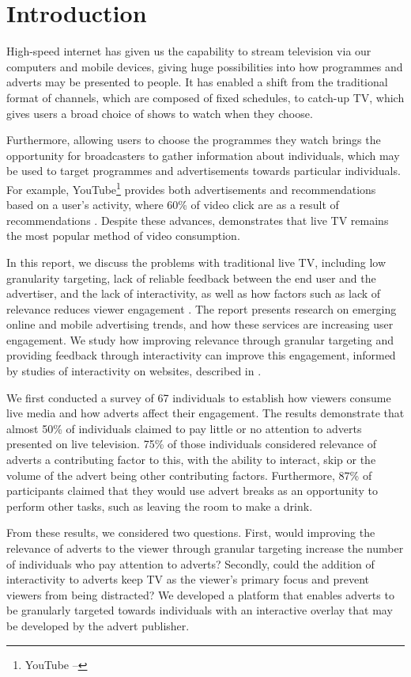 \section{Introduction}
High-speed internet has given us the capability to stream television via our computers and mobile devices, giving huge possibilities into how programmes and adverts may be presented to people. It has enabled a shift from the traditional format of channels, which are composed of fixed schedules, to catch-up TV, which gives users a broad choice of shows to watch when they choose. 

Furthermore, allowing users to choose the programmes they watch brings the opportunity for broadcasters to gather information about individuals, which may be used to target programmes and advertisements towards particular individuals. For example, YouTube\footnote{YouTube -- } provides both advertisements and recommendations based on a user's activity, where 60\% of video click are as a result of recommendations \citep{davidson2012}. Despite these advances, \citet{three-screen} demonstrates that live TV remains the most popular method of video consumption.

In this report, we discuss the problems with traditional live TV, including low granularity targeting, lack of reliable feedback between the end user and the advertiser, and the lack of interactivity, as well as how factors such as lack of relevance reduces viewer engagement \citep{advertising_engagement}. The report presents research on emerging online and mobile advertising trends, and how these services are increasing user engagement. We study how improving relevance through granular targeting and providing feedback through interactivity can improve this engagement, informed by studies of interactivity on websites, described in \citet{Teo2003281}.

We first conducted a survey of 67 individuals to establish how viewers consume live media and how adverts affect their engagement. The results demonstrate that almost 50\% of individuals claimed to pay little or no attention to adverts presented on live television. 75\% of those individuals considered relevance of adverts a contributing factor to this, with the ability to interact, skip or the volume of the advert being other contributing factors. Furthermore, 87\% of participants claimed that they would use advert breaks as an opportunity to perform other tasks, such as leaving the room to make a drink.

From these results, we considered two questions. First, would improving the relevance of adverts to the viewer through granular targeting increase the number of individuals who pay attention to adverts? Secondly, could the addition of interactivity to adverts keep TV as the viewer's primary focus and prevent viewers from being distracted? We developed a platform that enables adverts to be granularly targeted towards individuals with an interactive overlay that may be developed by the advert publisher. 


